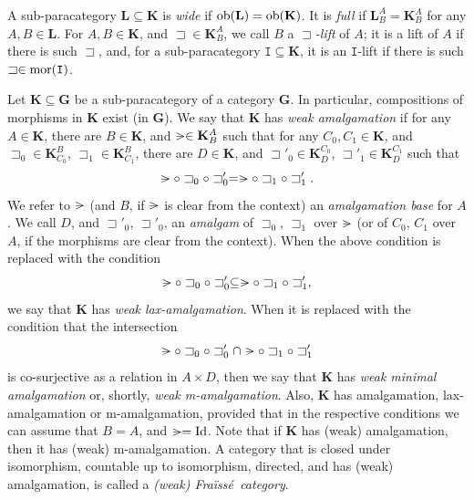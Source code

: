 \documentclass[12pt]{amsart}
\numberwithin{equation}{section}
\theoremstyle{plain}
\theoremstyle{definition}
\newcommand{\nil}{\mathrel{\vphantom{>}\text{\mathsurround=0pt\ooalign{$>$\cr$-$\cr}}}}
\newcommand \Id{ \mbox{Id}}
\newcommand \sqsp{\sqsupset}
\newcommand \mor{{\rm{mor}}}
\newcommand \ob{{\rm{ob}}}
\newcommand \fra{Fra\"{i}ss\'{e}}
\newcommand \GGb{\mathbf{G}}
\newcommand \KKb{\mathbf{K}}
\newcommand \LLb{\mathbf{L}}
\newcommand \It{\mathtt{I}}
\begin{document}
A sub-paracategory $\LLb \subseteq \KKb$ is \emph{wide} if $\ob(\LLb)=\ob(\KKb)$. It is \emph{full} if $\LLb^A_B=\KKb^A_B$ for any $A,B \in \LLb$.  
For $A, B \in \KKb$, and $\sqsp \in \KKb^A_B$, we call $B$ a \emph{$\sqsp$-lift} of $A$; it is a lift of $A$ if there is such $\sqsp$, and, for a sub-paracategory $\It \subseteq \KKb$, it is an $\It$-lift if there is such $\sqsp \in \mor(\It)$.


Let $\KKb \subseteq \GGb$ be a sub-paracategory of a category $\GGb$. In particular, compositions of morphisms in $\KKb$ exist (in $\GGb$). %
We say that $\KKb$ has \emph{weak amalgamation} if for any $A \in \KKb$, there are $B \in \KKb$, and $\nil \in \KKb^A_{B}$ such that for any $C_0,C_1 \in \KKb$, and $\sqsp_0 \in \KKb^B_{C_0}$, $\sqsp_1 \in \KKb^B_{C_1}$, there are $D \in \KKb$, and $\sqsp'_0 \in \KKb^{C_0}_D$, $\sqsp'_1 \in \KKb^{C_1}_D$ such that $$\nil \circ \sqsp_0 \circ \sqsp'_0=\nil \circ \sqsp_1 \circ \sqsp'_1.$$
%
We refer to $\nil$ (and $B$, if $\nil$ is clear from the context) an \emph{amalgamation base} for $A$. We call $D$, and $\sqsp'_0$, $\sqsp'_0$, an \emph{amalgam}  of $\sqsp_0$, $\sqsp_1$ over $\nil$ (or of $C_0$, $C_1$  over $A$, if the morphisms are clear from the context). When the above condition is replaced with the condition $$ \nil \circ \sqsp_0 \circ \sqsp'_0 \subseteq \nil \circ \sqsp_1 \circ \sqsp'_1,$$
%
we say that $\KKb$ has \emph{weak lax-amalgamation}. When it is replaced with the condition that the intersection  $$ \nil \circ \sqsp_0 \circ \sqsp'_0 \cap \nil \circ \sqsp_1 \circ \sqsp'_1$$
%
is co-surjective as a relation in $A \times D$, then we say that $\KKb$ has \emph{weak minimal amalgamation} or, shortly, \emph{weak m-amalgamation}. %
 Also, $\KKb$ has amalgamation, lax-amalgamation or m-amalgamation, provided that in the respective conditions we can assume that $B=A$, and $\nil=\Id$. Note that if $\KKb$ has (weak) amalgamation, then it has (weak) m-amalgamation. %
 A category that is closed under isomorphism, countable up to isomorphism, directed, and has (weak) amalgamation, is called a \emph{(weak) \fra \ category}.
 
\end{document}
